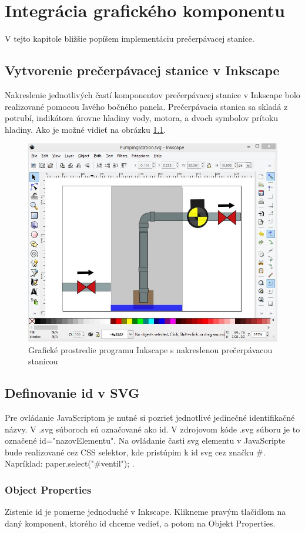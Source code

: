\chapter{Integrácia grafického komponentu}

V tejto kapitole bližšie popíšem implementáciu prečerpávacej stanice. 

\section{Vytvorenie prečerpávacej stanice v Inkscape}

Nakreslenie jednotlivých častí komponentov prečerpávacej stanice v Inkscape bolo realizované pomocou ľavého bočného panela. Prečerpávacia stanica sa skladá z potrubí, indikátora úrovne hladiny vody, motora, a dvoch symbolov prítoku hladiny. Ako je možné vidieť na obrázku  \ref{picture1}.  


\begin{figure}[H]
	\begin{center}
		\includegraphics[width=0.55\linewidth] {obrazky/pump1.jpg}
		\caption{Grafické prostredie programu Inkscape s nakreslenou prečerpávacou stanicou}
		\label{picture1}
	\end{center}
\end{figure}


\section{Definovanie id v SVG}

Pre ovládanie JavaScriptom je nutné si pozrieť jednotlivé jedinečné identifikačné názvy. V .svg súboroch sú označované ako id. V zdrojovom kóde .svg súboru je to označené id="nazovElementu". Na ovládanie časti svg elementu v JavaScripte bude realizované cez CSS selektor, kde pristúpim k id svg cez značku \#.  Napríklad: paper.select("\#ventil"); .


\subsection{Object Properties}
Zistenie id je pomerne jednoduché v Inkscape. Klikneme pravým tlačidlom na daný komponent, ktorého id chceme vedieť, a potom na Objekt Properties.

